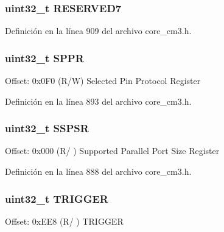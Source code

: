 \subsubsection[{\texorpdfstring{R\+E\+S\+E\+R\+V\+E\+D7}{RESERVED7}}]{\setlength{\rightskip}{0pt plus 5cm}uint32\+\_\+t R\+E\+S\+E\+R\+V\+E\+D7}\hypertarget{struct_t_p_i___type_a7055d97dce64c27cd79d6672bd41db21}{}\label{struct_t_p_i___type_a7055d97dce64c27cd79d6672bd41db21}


Definición en la línea 909 del archivo core\+\_\+cm3.\+h.

\subsubsection[{\texorpdfstring{S\+P\+PR}{SPPR}}]{ uint32\+\_\+t S\+P\+PR}\hypertarget{struct_t_p_i___type_a102814b254904beb9060757a93fe526c}{}\label{struct_t_p_i___type_a102814b254904beb9060757a93fe526c}
Offset\+: 0x0\+F0 (R/W) Selected Pin Protocol Register 

Definición en la línea 893 del archivo core\+\_\+cm3.\+h.

\subsubsection[{\texorpdfstring{S\+S\+P\+SR}{SSPSR}}]{ uint32\+\_\+t S\+S\+P\+SR}\hypertarget{struct_t_p_i___type_ad6abd8c7878d64e5e8e442de842f9de8}{}\label{struct_t_p_i___type_ad6abd8c7878d64e5e8e442de842f9de8}
Offset\+: 0x000 (R/ ) Supported Parallel Port Size Register 

Definición en la línea 888 del archivo core\+\_\+cm3.\+h.

\subsubsection[{\texorpdfstring{T\+R\+I\+G\+G\+ER}{TRIGGER}}]{ uint32\+\_\+t T\+R\+I\+G\+G\+ER}\hypertarget{struct_t_p_i___type_aa3adfea70bff38242f8231737a7fa2dd}{}\label{struct_t_p_i___type_aa3adfea70bff38242f8231737a7fa2dd}
Offset\+: 0x\+E\+E8 (R/ ) T\+R\+I\+G\+G\+ER 


